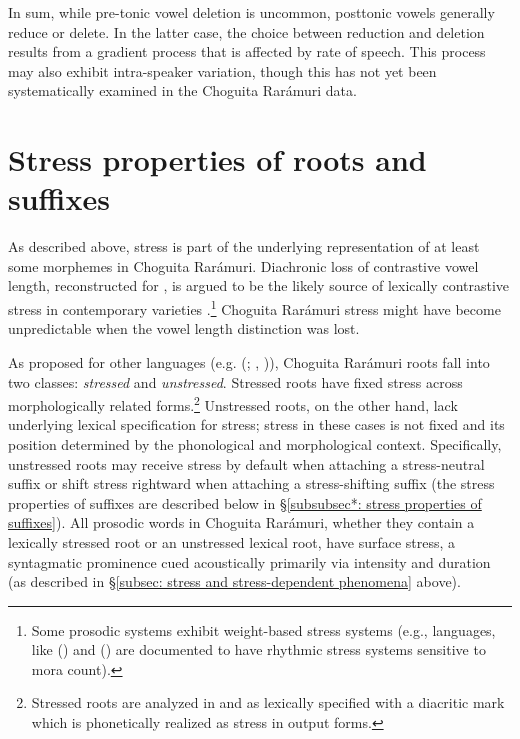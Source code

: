 In sum, while pre-tonic vowel deletion is uncommon, posttonic vowels generally reduce or delete. In the latter case, the choice between reduction and deletion results from a gradient process that is affected by rate of speech. This process may also exhibit intra-speaker variation, though this has not yet been systematically examined in the Choguita Rarámuri data.

\section{Stress properties of roots and suffixes}
\label{sec: stress properties of roots, stems and suffixes}

As described above, stress is part of the underlying representation of at least some morphemes in Choguita Rarámuri. Diachronic loss of contrastive vowel length, reconstructed for  \parencite{campbell1978proto}, is argued to be the likely source of lexically contrastive stress in contemporary  varieties \parencite{munro1977towards}.\footnote{Some  prosodic systems exhibit weight-based stress systems (e.g.,  languages, like  (\citealt{sapir1930southern}) and  (\citealt{dayley1989tumpisa}) are documented to have rhythmic stress systems sensitive to mora count).} Choguita Rarámuri stress might have become unpredictable when the  vowel length distinction was lost.

As proposed for other  languages (e.g.  (; \citealt{hill1968stress}, \citealt{alderete2001dominance})), Choguita Rarámuri roots fall into two classes: \textit{stressed} and \textit{unstressed}. Stressed roots have fixed stress across morphologically related forms.\footnote{Stressed roots are analyzed in \citet{caballero2008choguita} and \citet{caballero2011morphologically} as lexically specified with a diacritic mark which is phonetically realized as stress in output forms.} Unstressed roots, on the other hand, lack underlying lexical specification for stress; stress in these cases is not fixed and its position determined by the phonological and morphological context. Specifically, unstressed roots may receive stress by default when attaching a stress-neutral suffix or shift stress rightward when attaching a stress-shifting suffix (the stress properties of suffixes are described below in §\ref{subsubsec*: stress properties of suffixes}). All prosodic words in Choguita Rarámuri, whether they contain a lexically stressed root or an unstressed lexical root, have surface stress, a syntagmatic prominence cued acoustically primarily via intensity and duration (as described in §\ref{subsec: stress and stress-dependent phenomena} above).

